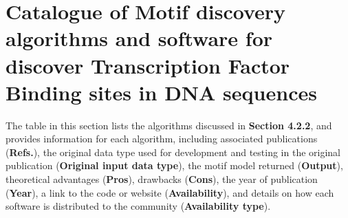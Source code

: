 \documentclass[a4paper, titlepage, openright]{book}
\begin{document}
\section{Catalogue of Motif discovery algorithms and software for discover Transcription Factor Binding sites in DNA sequences}
The table in this section lists the algorithms discussed in \textbf{Section 4.2.2}, and provides information for each algorithm, including associated publications (\textbf{Refs.}), the original data type used for development and testing in the original publication (\textbf{Original input data type}), the motif model returned (\textbf{Output}), theoretical advantages (\textbf{Pros}), drawbacks (\textbf{Cons}), the year of publication (\textbf{Year}), a link to the code or website (\textbf{Availability}), and details on how each software is distributed to the community (\textbf{Availability type}).
\end{document}
